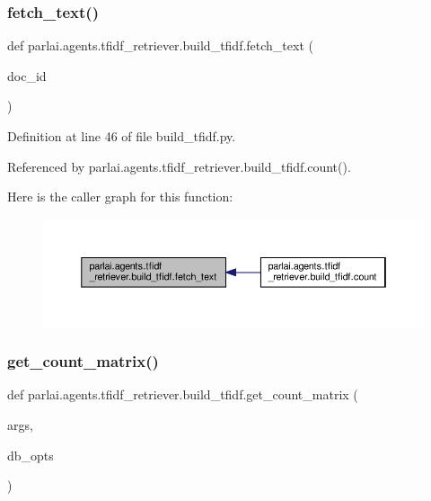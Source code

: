 \subsubsection{\texorpdfstring{fetch\+\_\+text()}{fetch\_text()}}
{\footnotesize\ttfamily def parlai.\+agents.\+tfidf\+\_\+retriever.\+build\+\_\+tfidf.\+fetch\+\_\+text (\begin{DoxyParamCaption}\item[{}]{doc\+\_\+id }\end{DoxyParamCaption})}



Definition at line 46 of file build\+\_\+tfidf.\+py.



Referenced by parlai.\+agents.\+tfidf\+\_\+retriever.\+build\+\_\+tfidf.\+count().

Here is the caller graph for this function\+:
\nopagebreak
\begin{figure}[H]
\begin{center}
\leavevmode
\includegraphics[width=350pt]{namespaceparlai_1_1agents_1_1tfidf__retriever_1_1build__tfidf_a8f16fdf4641c497d12c19f128ed4647a_icgraph}
\end{center}
\end{figure}
\mbox{\label{namespaceparlai_1_1agents_1_1tfidf__retriever_1_1build__tfidf_a0d95180be94e232e3ebc748c8aa7b9a0}} 
\subsubsection{\texorpdfstring{get\+\_\+count\+\_\+matrix()}{get\_count\_matrix()}}
{\footnotesize\ttfamily def parlai.\+agents.\+tfidf\+\_\+retriever.\+build\+\_\+tfidf.\+get\+\_\+count\+\_\+matrix (\begin{DoxyParamCaption}\item[{}]{args,  }\item[{}]{db\+\_\+opts }\end{DoxyParamCaption})}

